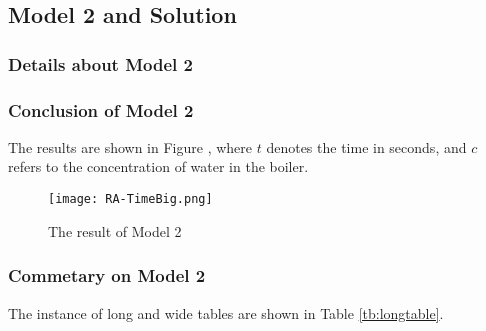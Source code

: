 \documentclass[12pt]{article}  %
\begin{document}
\subsection{Model 2 and Solution}
\subsubsection{Details about Model 2}


\subsubsection{Conclusion of Model 2}
The results are shown in Figure , where $t$ denotes the time in seconds, and $c$ refers to the concentration of water in the boiler.

\begin{figure}[htbp]
\centering
\texttt{[image: RA-TimeBig.png]}
\caption{The result of Model 2}\label{fig:666}
\end{figure}

\subsubsection{Commetary on Model 2}
The instance of long and wide tables are shown in Table \ref{tb:longtable}.
\end{document}
